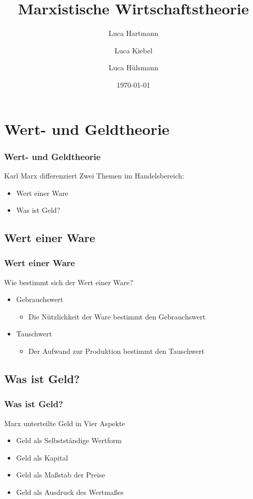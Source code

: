 \documentclass[10pt,a4paper, ngerman]{beamer}
\author{Luca Hartmann \and Luca Kiebel \and Luca Hülsmann}
\title{Marxistische Wirtschaftstheorie}
\date{\today}
\institute[HBBK]{Hans-Böckler-Berufskolleg}
\begin{document}
\begin{frame}
\titlepage
\end{frame}

\section{Wert- und Geldtheorie}
\begin{frame}
  \frametitle{Wert- und Geldtheorie}
  Karl Marx differenziert Zwei Themen im Handelsbereich:
  \pause
  \begin{itemize}
    \item Wert einer Ware
    \pause
    \item Was ist Geld?
  \end{itemize}
\end{frame}
\subsection{Wert einer Ware}
\begin{frame}
  \frametitle{Wert einer Ware}
  Wie bestimmt sich der Wert einer Ware?
  \pause
  \begin{itemize}
    \item Gebrauchswert
    \pause
    \begin{itemize}
      \item Die Nützlichkeit der Ware bestimmt den Gebrauchswert
    \end{itemize}
    \pause
    \item Tauschwert
    \pause
    \begin{itemize}
      \item Der Aufwand zur Produktion bestimmt den Tauschwert
    \end{itemize}
  \end{itemize}
\end{frame}
\subsection{Was ist Geld?}
\begin{frame}
  \frametitle{Was ist Geld?}
  Marx unterteilte Geld in Vier Aspekte
  \pause
  \begin{itemize}
    \item Geld als Selbstständige Wertform \pause
    \item Geld als Kapital \pause
    \item Geld als Maßstab der Preise \pause
    \item Geld als Ausdruck des Wertmaßes
  \end{itemize}
\end{frame}
\end{document}
